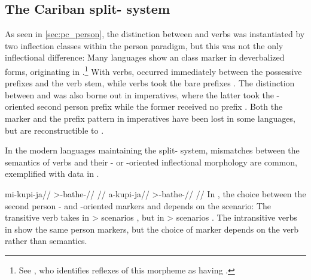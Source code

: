 \subsection{The Cariban split- system}
\label{sec:split}
As seen in \cref{sec:pc_person}, the distinction between  and  verbs was instantiated by two inflection classes within the \PC \setone person paradigm, but this was not the only inflectional difference:
%
Many languages show an  class marker in deverbalized forms, originating in \PC {}.\footnote{See \textcite[227]{meira2000split}, who identifies reflexes of this morpheme as having .}
With  verbs,  occurred immediately between the possessive prefixes and the verb stem, while  verbs took the bare prefixes .
%
%
%
%
%
%
%
The distinction between  and  was also borne out in imperatives, where the latter took the -oriented second person prefix  while the former received no prefix .
Both the  marker  and the prefix pattern in imperatives have been lost in some languages, but are reconstructible to \PC.


In the modern languages maintaining the split- system, mismatches between the semantics of verbs and their - or -oriented inflectional morphology are common, exemplified with \kalina data in .

 \kalina
{}
\begingl
\gla mi-kupi-ja//
\glb {}>-bathe-//
\glft {} \parencite[][160]{hoff1968carib}//
\endgl
{}
\begingl
\gla a-kupi-ja//
\glb {}>-bathe-//
\glft {} \parencite[][63]{yamada2011evidentiality}//
\endgl
\xe
%
In , the choice between the second person - and -oriented markers  and  depends on the scenario:
The transitive verb   takes  in > scenarios , but  in > scenarios .
The intransitive verbs in  show the same person markers, but the choice of marker depends on the verb rather than semantics.

